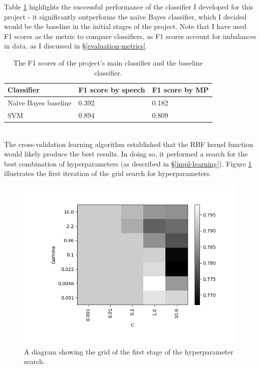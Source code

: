 \documentclass[12pt,a4paper,twoside,openright]{report}
\begin{document}
Table \ref{table:results} highlights the successful performance of the classifier I developed for this project - it significantly outperforms the na\"{i}ve Bayes classifier, which I decided would be the baseline in the initial stages of the project. Note that I have used F1 scores as the metric to compare classifiers, as F1 scores account for imbalances in data, as I discussed in \S\ref{evaluation-metrics}.
\\
\begin{table}[]
	\centering
	\begin{tabular}{lll}
		\hline
		\textbf{Classifier}      & \textbf{F1 score by speech} & \textbf{F1 score by MP} \\ \hline
		Na\"{i}ve Bayes baseline & 0.392                       & 0.182                   \\
		SVM                      & 0.894                       & 0.809                   \\ \hline
	\end{tabular}
	\caption{The F1 scores of the project's main classifier and the baseline classifier.}
	\label{table:results}	
\end{table}
\\
The cross-validation learning algorithm established that the RBF kernel function would likely produce the best results. In doing so, it performed a search for the best combination of hyperparameters (as described in \S\ref{impl-learning}). Figure \ref{fig:hyperparamgrid} illustrates the first iteration of the grid search for hyperparameters.
\\
\begin{figure}
	\begin{center}
		\includegraphics[scale=0.8]{figs/hyperparamgrid.png}
	\end{center}
	\caption{A diagram showing the grid of the first stage of the hyperparameter search.}
	\label{fig:hyperparamgrid}
\end{figure}
\end{document}
